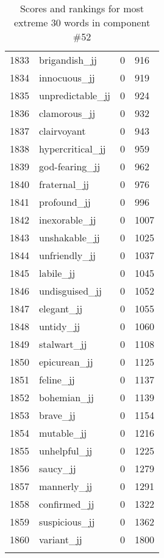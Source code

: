 \begin{longtable}[!htbp]{| rlr@{.}l |}
    1833 & brigandish\_jj & 0 & 916 \\
    1834 & innocuous\_jj & 0 & 919 \\
    1835 & unpredictable\_jj & 0 & 924 \\
    1836 & clamorous\_jj & 0 & 932 \\
    1837 & clairvoyant & 0 & 943 \\
    1838 & hypercritical\_jj & 0 & 959 \\
    1839 & god-fearing\_jj & 0 & 962 \\
    1840 & fraternal\_jj & 0 & 976 \\
    1841 & profound\_jj & 0 & 996 \\
    1842 & inexorable\_jj & 0 & 1007 \\
    1843 & unshakable\_jj & 0 & 1025 \\
    1844 & unfriendly\_jj & 0 & 1037 \\
    1845 & labile\_jj & 0 & 1045 \\
    1846 & undisguised\_jj & 0 & 1052 \\
    1847 & elegant\_jj & 0 & 1055 \\
    1848 & untidy\_jj & 0 & 1060 \\
    1849 & stalwart\_jj & 0 & 1108 \\
    1850 & epicurean\_jj & 0 & 1125 \\
    1851 & feline\_jj & 0 & 1137 \\
    1852 & bohemian\_jj & 0 & 1139 \\
    1853 & brave\_jj & 0 & 1154 \\
    1854 & mutable\_jj & 0 & 1216 \\
    1855 & unhelpful\_jj & 0 & 1225 \\
    1856 & saucy\_jj & 0 & 1279 \\
    1857 & mannerly\_jj & 0 & 1291 \\
    1858 & confirmed\_jj & 0 & 1322 \\
    1859 & suspicious\_jj & 0 & 1362 \\
    1860 & variant\_jj & 0 & 1800 \\
    \hline
    \caption{Scores and rankings for most extreme 30 words in component \#52} \\
\end{longtable}
